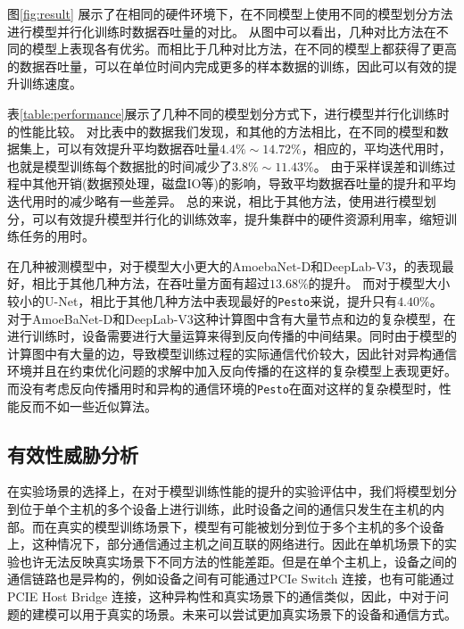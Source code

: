 图\ref{fig:result} 展示了在相同的硬件环境下，在不同模型上使用不同的模型划分方法进行模型并行化训练时数据吞吐量的对比。
从图中可以看出，几种对比方法在不同的模型上表现各有优劣。而相比于几种对比方法，\sys{}在不同的模型上都获得了更高的数据吞吐量，可以在单位时间内完成更多的样本数据的训练，因此可以有效的提升训练速度。



表\ref{table:performance}展示了几种不同的模型划分方式下，进行模型并行化训练时的性能比较。
对比表中的数据我们发现，\sys{}和其他的方法相比，在不同的模型和数据集上，可以有效提升平均数据吞吐量$4.4\% \sim 14.72\%$，相应的，平均迭代用时，也就是模型训练每个数据批的时间减少了$3.8\% \sim  11.43\%$。
由于采样误差和训练过程中其他开销(数据预处理，磁盘IO等)的影响，导致平均数据吞吐量的提升和平均迭代用时的减少略有一些差异。
总的来说，相比于其他方法，使用\sys{}进行模型划分，可以有效提升模型并行化的训练效率，提升集群中的硬件资源利用率，缩短训练任务的用时。


在几种被测模型中，对于模型大小更大的AmoebaNet-D和DeepLab-V3，\sys{}的表现最好，相比于其他几种方法，在吞吐量方面有超过$13.68\%$的提升。
而对于模型大小较小的U-Net，\sys{}相比于其他几种方法中表现最好的\texttt{Pesto}来说，提升只有$4.40\%$。
对于AmoeBaNet-D和DeepLab-V3这种计算图中含有大量节点和边的复杂模型，在进行训练时，设备需要进行大量运算来得到反向传播的中间结果。同时由于模型的计算图中有大量的边，导致模型训练过程的实际通信代价较大，因此针对异构通信环境并且在约束优化问题的求解中加入反向传播的\sys{}在这样的复杂模型上表现更好。而没有考虑反向传播用时和异构的通信环境的\texttt{Pesto}在面对这样的复杂模型时，性能反而不如一些近似算法。

\subsection{有效性威胁分析}
\label{sec:threat}


在实验场景的选择上，在\sys 对于模型训练性能的提升的实验评估中，我们将模型划分到位于单个主机的多个设备上进行训练，此时设备之间的通信只发生在主机的内部。而在真实的模型训练场景下，模型有可能被划分到位于多个主机的多个设备上，这种情况下，部分通信通过主机之间互联的网络进行。因此在单机场景下的实验也许无法反映真实场景下不同方法的性能差距。但是在单个主机上，设备之间的通信链路也是异构的，例如设备之间有可能通过PCIe Switch 连接，也有可能通过PCIE Host Bridge 连接，这种异构性和真实场景下的通信类似，因此，\sys 中对于问题的建模可以用于真实的场景。未来可以尝试更加真实场景下的设备和通信方式。



